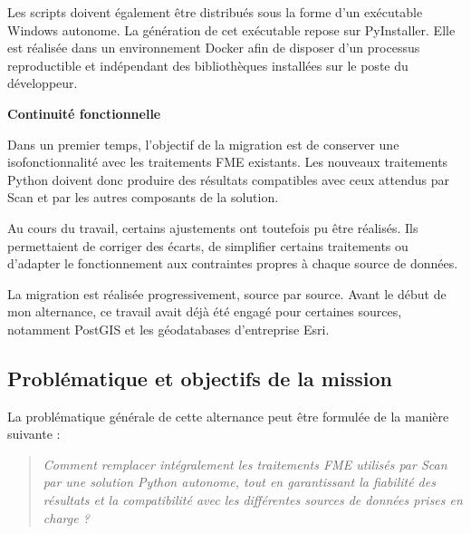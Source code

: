 Les scripts doivent également être distribués sous la forme d'un exécutable
Windows autonome. La génération de cet exécutable repose sur PyInstaller. Elle est réalisée dans
un environnement Docker afin de disposer d'un processus reproductible et
indépendant des bibliothèques installées sur le poste du développeur.

\medskip

\noindent
\textbf{Continuité fonctionnelle}

\medskip

Dans un premier temps, l'objectif de la migration est de conserver une
isofonctionnalité avec les traitements FME existants. Les nouveaux traitements
Python doivent donc produire des résultats compatibles avec ceux attendus par
Scan et par les autres composants de la solution.

Au cours du travail, certains ajustements ont toutefois pu être réalisés. Ils
permettaient de corriger des écarts, de simplifier certains traitements ou
d'adapter le fonctionnement aux contraintes propres à chaque source de données.

La migration est réalisée progressivement, source par source. Avant le début de
mon alternance, ce travail avait déjà été engagé pour certaines sources,
notamment PostGIS et les géodatabases d'entreprise Esri.



\subsection{Problématique et objectifs de la mission}
\label{subsec:objectifs_mission}

La problématique générale de cette alternance peut être formulée de la manière
suivante :

\begin{quote}
\itshape
Comment remplacer intégralement les traitements FME utilisés par Scan par
une solution Python autonome, tout en garantissant la fiabilité des
résultats et la compatibilité avec les différentes sources de données
prises en charge ?
\end{quote}

